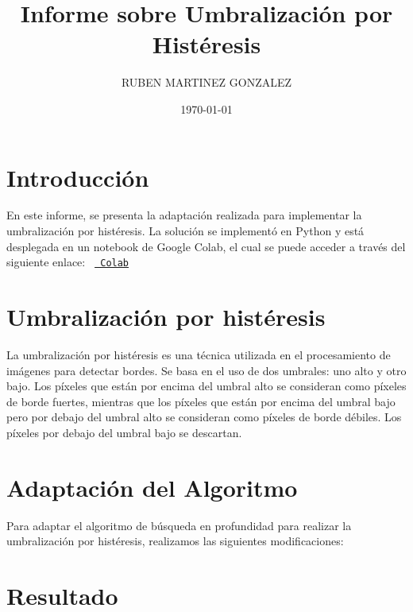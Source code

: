 \documentclass{article}
\title{Informe sobre Umbralización por Histéresis}
\author{RUBEN MARTINEZ GONZALEZ}
\date{\today}
\begin{document}
\maketitle

\section{Introducción}
\noindent
En este informe, se presenta la adaptación realizada para implementar la umbralización por histéresis.
\noindent
La solución se implementó en Python y está desplegada en un notebook de Google Colab, el cual se puede acceder a través del siguiente enlace:
\texttt{%
    \href{https://colab.research.google.com/drive/1jJnkRD_QYszGcF4tEZ0V2oYQkkZl8hcF?usp=sharing}{%
        Colab}%
}
\section{Umbralización por histéresis}
La umbralización por histéresis es una técnica utilizada en el procesamiento de imágenes para detectar bordes. Se basa en el uso de dos umbrales: uno alto y otro bajo. Los píxeles que están por encima del umbral alto se consideran como píxeles de borde fuertes, mientras que los píxeles que están por encima del umbral bajo pero por debajo del umbral alto se consideran como píxeles de borde débiles. Los píxeles por debajo del umbral bajo se descartan.

\section{Adaptación del Algoritmo}
Para adaptar el algoritmo de búsqueda en profundidad para realizar la umbralización por histéresis, realizamos las siguientes modificaciones:


\section{Resultado}
\end{document}

